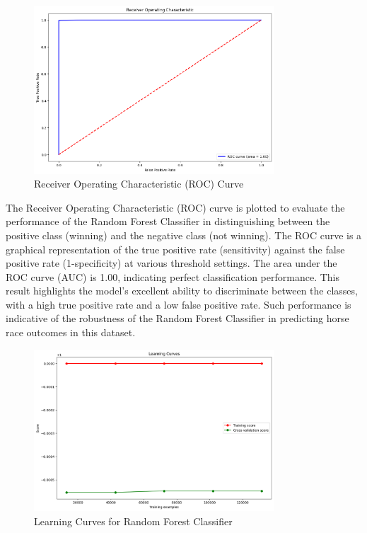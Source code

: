 \documentclass{article}
\begin{document}
\begin{figure}[H]
    \centering
    \includegraphics[width=0.8\textwidth]{images/roc_curve.png} %
    \caption{Receiver Operating Characteristic (ROC) Curve}
    \label{fig:roc_curve}
\end{figure}

The Receiver Operating Characteristic (ROC) curve is plotted to evaluate the performance of the Random Forest Classifier in distinguishing between the positive class (winning) and the negative class (not winning). The ROC curve is a graphical representation of the true positive rate (sensitivity) against the false positive rate (1-specificity) at various threshold settings. The area under the ROC curve (AUC) is 1.00, indicating perfect classification performance. This result highlights the model's excellent ability to discriminate between the classes, with a high true positive rate and a low false positive rate. Such performance is indicative of the robustness of the Random Forest Classifier in predicting horse race outcomes in this dataset.

\begin{figure}[H]
    \centering
    \includegraphics[width=0.8\textwidth]{images/learning_curves.png} %
    \caption{Learning Curves for Random Forest Classifier}
    \label{fig:learning_curves}
\end{figure}
\end{document}
